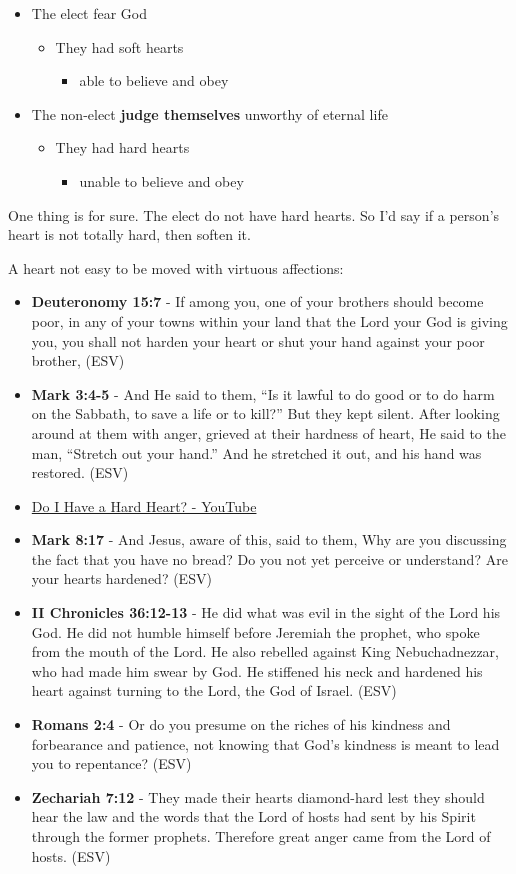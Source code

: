 \documentclass[11pt]{article}
\begin{document}
\begin{itemize}
\item The elect fear God
\begin{itemize}
\item They had soft hearts
\begin{itemize}
\item able to believe and obey
\end{itemize}
\end{itemize}
\item The non-elect \textbf{judge themselves} unworthy of eternal life
\begin{itemize}
\item They had hard hearts
\begin{itemize}
\item unable to believe and obey
\end{itemize}
\end{itemize}
\end{itemize}

One thing is for sure. The elect do not have hard hearts.
So I'd say if a person's heart is not totally hard, then soften it.

A heart not easy to be moved with virtuous affections:
\begin{itemize}
\item \textbf{Deuteronomy 15:7} - If among you, one of your brothers should become poor, in any of your towns within your land that the Lord your God is giving you, you shall not harden your heart or shut your hand against your poor brother, (ESV)
\item \textbf{Mark 3:4-5} - And He said to them, “Is it lawful to do good or to do harm on the Sabbath, to save a life or to kill?” But they kept silent. After looking around at them with anger, grieved at their hardness of heart, He said to the man, “Stretch out your hand.” And he stretched it out, and his hand was restored. (ESV)
\item \href{https://www.youtube.com/watch?v=JaMVzW9yiBc}{Do I Have a Hard Heart? - YouTube}
\item \textbf{Mark 8:17} - And Jesus, aware of this, said to them, Why are you discussing the fact that you have no bread? Do you not yet perceive or understand? Are your hearts hardened? (ESV)
\item \textbf{II Chronicles 36:12-13} - He did what was evil in the sight of the Lord his God. He did not humble himself before Jeremiah the prophet, who spoke from the mouth of the Lord. He also rebelled against King Nebuchadnezzar, who had made him swear by God. He stiffened his neck and hardened his heart against turning to the Lord, the God of Israel. (ESV)
\item \textbf{Romans 2:4} - Or do you presume on the riches of his kindness and forbearance and patience, not knowing that God's kindness is meant to lead you to repentance? (ESV)
\item \textbf{Zechariah 7:12} - They made their hearts diamond-hard lest they should hear the law and the words that the Lord of hosts had sent by his Spirit through the former prophets. Therefore great anger came from the Lord of hosts. (ESV)
\end{itemize}
\end{document}
